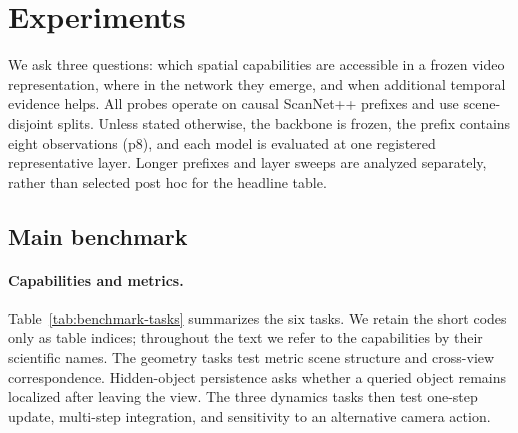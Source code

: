 
\providecommand{\TBD}{\textit{TBD}}
\providecommand{\model}[1]{\textsc{#1}}
\providecommand{\figplaceholder}[2][3.1cm]{%
  \fbox{\parbox[c][#1][c]{0.94\linewidth}{\centering\small #2}}}

\section{Experiments}
\label{sec:experiments}

We ask three questions: which spatial capabilities are accessible in a frozen
video representation, where in the network they emerge, and when additional
temporal evidence helps.  All probes operate on causal ScanNet++ prefixes and
use scene-disjoint splits.  Unless stated otherwise, the backbone is frozen,
the prefix contains eight observations (p8), and each model is evaluated at one
registered representative layer.  Longer prefixes and layer sweeps are analyzed
separately, rather than selected post hoc for the headline table.

\subsection{Main benchmark}
\label{sec:main-benchmark}

\paragraph{Capabilities and metrics.}
Table~\ref{tab:benchmark-tasks} summarizes the six tasks.  We retain the short
codes only as table indices; throughout the text we refer to the capabilities
by their scientific names.  The geometry tasks test metric scene structure and
cross-view correspondence.  Hidden-object persistence asks whether a queried
object remains localized after leaving the view.  The three dynamics tasks then
test one-step update, multi-step integration, and sensitivity to an alternative
camera action.

